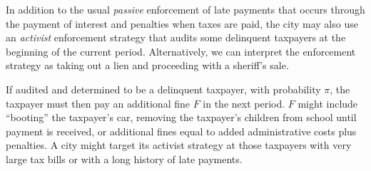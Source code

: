 \documentclass[12pt]{article}
\begin{document}
In addition to the usual \textit{passive} enforcement of late payments
that occurs through the payment of interest and penalties when taxes
are paid, the city may also use an \textit{activist} enforcement
strategy that audits some delinquent taxpayers at the beginning of the
current period. Alternatively, we can interpret the enforcement
strategy as taking out a lien and proceeding with a sheriff's sale.

If audited and determined to be a delinquent taxpayer, with
probability $\pi$, the taxpayer must then pay an additional fine $F$
in the next period.  $F$ might include ``booting'' the taxpayer's car,
removing the taxpayer's children from school until payment is
received, or additional fines equal to added administrative costs plus
penalties.  A city might target its activist strategy at those
taxpayers with very large tax bills or with a long history of late
payments.
\end{document}
